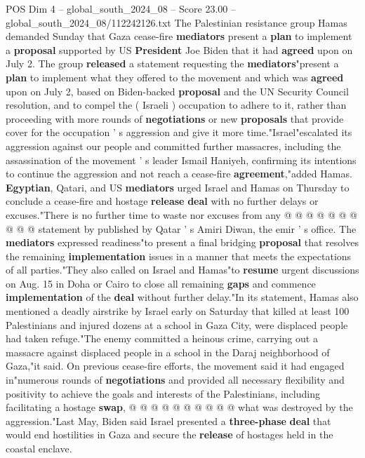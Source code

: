 \begin{textsample}{POS Dim 4 – global\_south\_2024\_08 – Score 23.00 – global\_south\_2024\_08/112242126.txt}  \label{ex:f4_pos_125}
The Palestinian resistance group Hamas demanded Sunday that Gaza cease-fire \textbf{mediators} present a \textbf{plan} to implement a \textbf{proposal} supported by US \textbf{President} Joe Biden that it had \textbf{agreed} upon on July 2.
The group \textbf{released} a statement requesting the \textbf{mediators}"present a \textbf{plan} to implement what they offered to the movement and which was \textbf{agreed} upon on July 2, based on Biden-backed \textbf{proposal} and the UN Security Council resolution, and to compel the ( Israeli ) occupation to adhere to it, rather than proceeding with more rounds of \textbf{negotiations} or new \textbf{proposals} that provide cover for the occupation ' s aggression and give it more time."Israel"escalated its aggression against our people and committed further massacres, including the assassination of the movement ' s leader Ismail Haniyeh, confirming its intentions to continue the aggression and not reach a cease-fire \textbf{agreement},"added Hamas. \textbf{Egyptian}, Qatari, and US \textbf{mediators} urged Israel and Hamas on Thursday to conclude a cease-fire and hostage \textbf{release} \textbf{deal} with no further delays or excuses."There is no further time to waste nor excuses from any @ @ @ @ @ @ @ @ @ @ statement by published by Qatar ' s Amiri Diwan, the emir ' s office.
The \textbf{mediators} expressed readiness"to present a final bridging \textbf{proposal} that resolves the remaining \textbf{implementation} issues in a manner that meets the expectations of all parties."They also called on Israel and Hamas"to \textbf{resume} urgent discussions on Aug. 15 in Doha or Cairo to close all remaining \textbf{gaps} and commence \textbf{implementation} of the \textbf{deal} without further delay."In its statement, Hamas also mentioned a deadly airstrike by Israel early on Saturday that killed at least 100 Palestinians and injured dozens at a school in Gaza City, were displaced people had taken refuge."The enemy committed a heinous crime, carrying out a massacre against displaced people in a school in the Daraj neighborhood of Gaza,"it said.
On previous cease-fire efforts, the movement said it had engaged in"numerous rounds of \textbf{negotiations} and provided all necessary flexibility and positivity to achieve the goals and interests of the Palestinians, including facilitating a hostage \textbf{swap}, @ @ @ @ @ @ @ @ @ @ what was destroyed by the aggression."Last May, Biden said Israel presented a \textbf{three-phase} \textbf{deal} that would end hostilities in Gaza and secure the \textbf{release} of hostages held in the coastal enclave.

\end{textsample}
